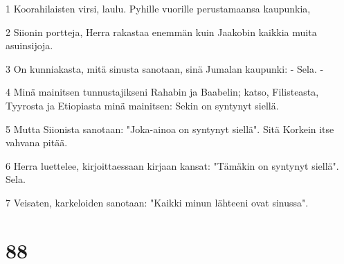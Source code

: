 \par 1 Koorahilaisten virsi, laulu. Pyhille vuorille perustamaansa kaupunkia,
\par 2 Siionin portteja, Herra rakastaa enemmän kuin Jaakobin kaikkia muita asuinsijoja.
\par 3 On kunniakasta, mitä sinusta sanotaan, sinä Jumalan kaupunki: - Sela. -
\par 4 Minä mainitsen tunnustajikseni Rahabin ja Baabelin; katso, Filisteasta, Tyyrosta ja Etiopiasta minä mainitsen: Sekin on syntynyt siellä.
\par 5 Mutta Siionista sanotaan: "Joka-ainoa on syntynyt siellä". Sitä Korkein itse vahvana pitää.
\par 6 Herra luettelee, kirjoittaessaan kirjaan kansat: "Tämäkin on syntynyt siellä". Sela.
\par 7 Veisaten, karkeloiden sanotaan: "Kaikki minun lähteeni ovat sinussa".

\chapter{88}

